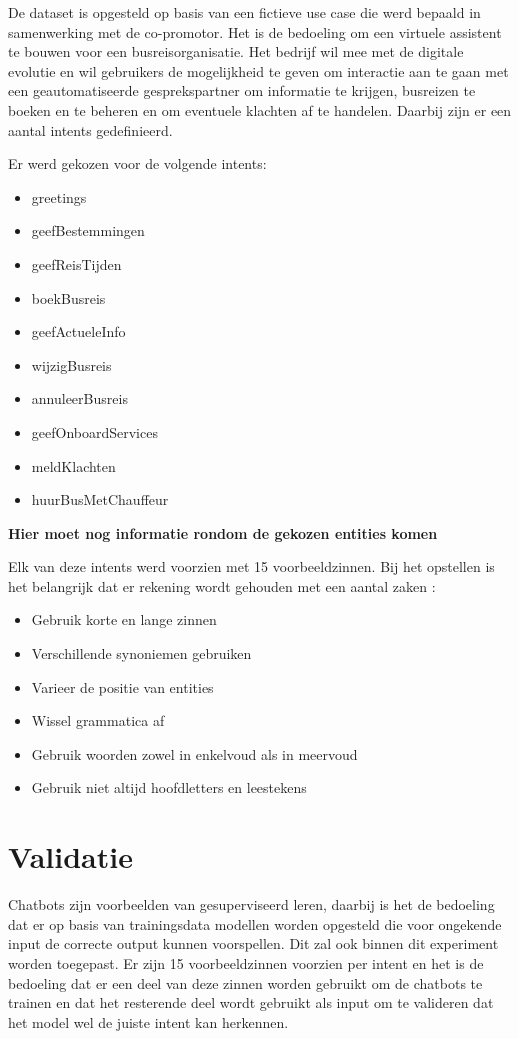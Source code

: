 De dataset is opgesteld op basis van een fictieve use case die werd bepaald in samenwerking met de co-promotor. Het is de bedoeling om een virtuele assistent te bouwen voor een busreisorganisatie. Het bedrijf wil mee met de digitale evolutie en wil gebruikers de mogelijkheid te geven om interactie aan te gaan met een geautomatiseerde gesprekspartner om informatie te krijgen, busreizen te boeken en te beheren en om eventuele klachten af te handelen. Daarbij zijn er een aantal intents gedefinieerd.

Er werd gekozen voor de volgende intents:
\begin{itemize}
    \item greetings
    \item geefBestemmingen
    \item geefReisTijden
    \item boekBusreis
    \item geefActueleInfo
    \item wijzigBusreis
    \item annuleerBusreis
    \item geefOnboardServices
    \item meldKlachten
    \item huurBusMetChauffeur
\end{itemize}

\textbf{Hier moet nog informatie rondom de gekozen entities komen}

Elk van deze intents werd voorzien met 15 voorbeeldzinnen. Bij het opstellen is het belangrijk dat er rekening wordt gehouden met een aantal zaken \autocite{Greyling2019}:
\begin{itemize}
    \item Gebruik korte en lange zinnen
    \item Verschillende synoniemen gebruiken
    \item Varieer de positie van entities
    \item Wissel grammatica af
    \item Gebruik woorden zowel in enkelvoud als in meervoud
    \item Gebruik niet altijd hoofdletters en leestekens
\end{itemize}

\section{Validatie}
\label{sec:validatie}

Chatbots zijn voorbeelden van gesuperviseerd leren, daarbij is het de bedoeling dat er op basis van trainingsdata modellen worden opgesteld die voor ongekende input de correcte output kunnen voorspellen. Dit zal ook binnen dit experiment worden toegepast. Er zijn 15 voorbeeldzinnen voorzien per intent en het is de bedoeling dat er een deel van deze zinnen worden gebruikt om de chatbots te trainen en dat het resterende deel wordt gebruikt als input om te valideren dat het model wel de juiste intent kan herkennen.

